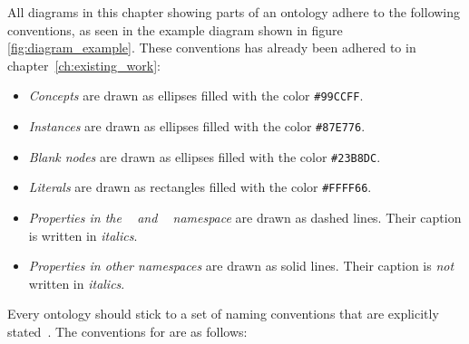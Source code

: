 All diagrams in this chapter showing parts of an ontology adhere to the following conventions, as seen in the example diagram shown in figure \ref{fig:diagram_example}. These conventions has already been adhered to in chapter~\ref{ch:existing_work}:
\begin{itemize}
  \item \emph{Concepts} are drawn as ellipses filled with the color \texttt{\textcolor{convention_color1}{\#99CCFF}}.
  \item \emph{Instances} are drawn as ellipses filled with the color \texttt{\textcolor{convention_color2}{\#87E776}}.
  \item \emph{Blank nodes} are drawn as ellipses filled with the color \texttt{\textcolor{convention_color3}{\#23B8DC}}.
  \item \emph{Literals} are drawn as rectangles filled with the color \texttt{\colorbox{convention_color_bg4}{\textcolor{convention_color4}{\#FFFF66}}}.
  \item \emph{Properties in the ~\cite{RDF} and ~\cite{RDFS} namespace} are drawn as dashed lines. Their caption is written in \emph{italics}.
  \item \emph{Properties in other namespaces} are drawn as solid lines. Their caption is \emph{not} written in \emph{italics}.
\end{itemize}

Every ontology should stick to a set of naming conventions that are explicitly stated~\cite{Ontology101}. The conventions for \smarthomeweather are as follows:

